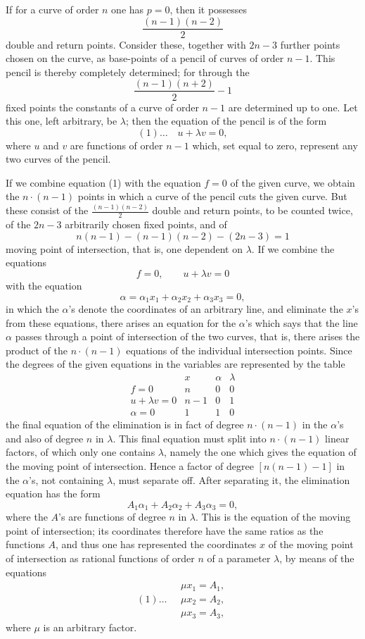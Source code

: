 \documentclass[10pt]{article}
\begin{document}
If for a curve of order \(n\) one has \(p=0\), then it possesses
\[
\frac{(n-1)(n-2)}{2}
\]
double and return points. Consider these, together with \(2n-3\) further points chosen on the curve, as base-points of a pencil of curves of order \(n-1\). This pencil is thereby completely determined; for through the
\[
\frac{(n-1)(n+2)}{2}-1
\]
fixed points the constants of a curve of order \(n-1\) are determined up to one. Let this one, left arbitrary, be \(\lambda\); then the equation of the pencil is of the form
\[
(1)\ldots\quad u+\lambda v=0,
\]
where \(u\) and \(v\) are functions of order \(n-1\) which, set equal to zero, represent any two curves of the pencil.

If we combine equation (1) with the equation \(f=0\) of the given curve, we obtain the \(n\cdot(n-1)\) points in which a curve of the pencil cuts the given curve. But these consist of the \(\frac{(n-1)(n-2)}{2}\) double and return points, to be counted twice, of the \(2n-3\) arbitrarily chosen fixed points, and of
\[
n(n-1)-(n-1)(n-2)-(2n-3)=1
\]
moving point of intersection, that is, one dependent on \(\lambda\). If we combine the equations
\[
f=0,\qquad u+\lambda v=0
\]
with the equation
\[
\alpha=\alpha_1x_1+\alpha_2x_2+\alpha_3x_3=0,
\]
in which the \(\alpha\)'s denote the coordinates of an arbitrary line, and eliminate the \(x\)'s from these equations, there arises an equation for the \(\alpha\)'s which says that the line \(\alpha\) passes through a point of intersection of the two curves, that is, there arises the product of the \(n\cdot(n-1)\) equations of the individual intersection points. Since the degrees of the given equations in the variables are represented by the table
\[
\begin{array}{c|ccc}
 & x & \alpha & \lambda\\ \hline
f=0 & n & 0 & 0\\
u+\lambda v=0 & n-1 & 0 & 1\\
\alpha=0 & 1 & 1 & 0
\end{array}
\]
the final equation of the elimination is in fact of degree \(n\cdot(n-1)\) in the \(\alpha\)'s and also of degree \(n\) in \(\lambda\). This final equation must split into \(n\cdot(n-1)\) linear factors, of which only one contains \(\lambda\), namely the one which gives the equation of the moving point of intersection. Hence a factor of degree \([n(n-1)-1]\) in the \(\alpha\)'s, not containing \(\lambda\), must separate off. After separating it, the elimination equation has the form
\[
A_1\alpha_1+A_2\alpha_2+A_3\alpha_3=0,
\]
where the \(A\)'s are functions of degree \(n\) in \(\lambda\). This is the equation of the moving point of intersection; its coordinates therefore have the same ratios as the functions \(A\), and thus one has represented the coordinates \(x\) of the moving point of intersection as rational functions of order \(n\) of a parameter \(\lambda\), by means of the equations
\[
(1)\ldots\quad
\begin{gathered}
\mu x_1=A_1,\\
\mu x_2=A_2,\\
\mu x_3=A_3,
\end{gathered}
\]
where \(\mu\) is an arbitrary factor.
\end{document}
